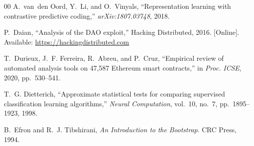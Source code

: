 \documentclass[conference]{IEEEtran}
\begin{document}
\begin{thebibliography}{00}
A.~van~den Oord, Y.~Li, and O.~Vinyals, ``Representation learning with contrastive
predictive coding,'' \emph{arXiv:1807.03748}, 2018.

P.~Daian, ``Analysis of the DAO exploit,'' Hacking Distributed, 2016. [Online].
Available: \url{https://hackingdistributed.com}

T.~Durieux, J.~F. Ferreira, R.~Abreu, and P.~Cruz, ``Empirical review of automated
analysis tools on 47,587 Ethereum smart contracts,'' in \emph{Proc. ICSE}, 2020,
pp.~530--541.

T.~G. Dietterich, ``Approximate statistical tests for comparing supervised
classification learning algorithms,'' \emph{Neural Computation}, vol.~10, no.~7,
pp.~1895--1923, 1998.

B.~Efron and R.~J. Tibshirani, \emph{An Introduction to the Bootstrap}. CRC Press,
1994.

\end{thebibliography}
\end{document}

